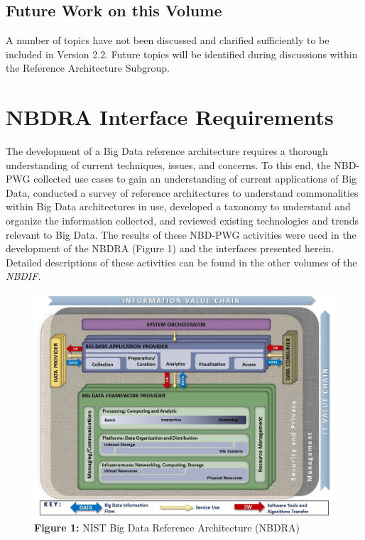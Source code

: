 \documentclass[9pt,]{article}
\begin{document}
\hypertarget{future-work-on-this-volume}{%
\subsection{Future Work on this
Volume}\label{future-work-on-this-volume}}

A number of topics have not been discussed and clarified sufficiently to
be included in Version 2.2. Future topics will be identified during
discussions within the Reference Architecture Subgroup.

\hypertarget{nbdra-interface-requirements}{%
\section{NBDRA Interface
Requirements}\label{nbdra-interface-requirements}}

The development of a Big Data reference architecture requires a thorough
understanding of current techniques, issues, and concerns. To this end,
the NBD-PWG collected use cases to gain an understanding of current
applications of Big Data, conducted a survey of reference architectures
to understand commonalities within Big Data architectures in use,
developed a taxonomy to understand and organize the information
collected, and reviewed existing technologies and trends relevant to Big
Data. The results of these NBD-PWG activities were used in the
development of the NBDRA (Figure 1) and the interfaces presented herein.
Detailed descriptions of these activities can be found in the other
volumes of the \emph{NBDIF}.

\begin{figure}
\centering
\includegraphics{images/bdra.png}
\caption{\textbf{Figure 1:} NIST Big Data Reference Architecture
(NBDRA)}
\end{figure}
\end{document}

